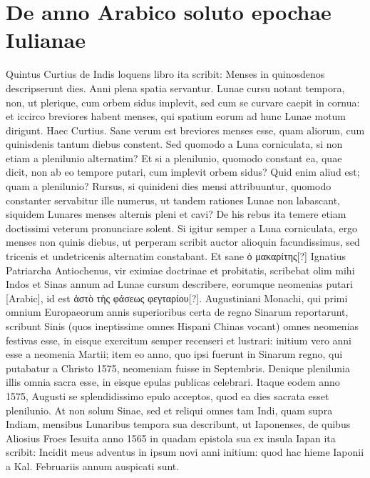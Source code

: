 \section{De anno Arabico soluto epochae Iulianae}
Quintus Curtius de Indis loquens libro  ita scribit: Menses
in quinosdenos descripserunt dies.
Anni plena spatia servantur.
Lunae cursu notant tempora, non, ut plerique, cum orbem
sidus implevit, sed cum se curvare caepit in cornua: et iccirco breviores
habent menses, qui spatium eorum ad hunc Lunae motum dirigunt.
Haec Curtius.
Sane verum est breviores menses esse, quam aliorum,
cum quinisdenis tantum diebus constent.
Sed quomodo a Luna
corniculata, si non etiam a plenilunio alternatim?
Et si a plenilunio,
quomodo constant ea, quae dicit, non ab eo tempore putari, cum implevit
orbem sidus?
Quid enim aliud est; quam a plenilunio?
Rursus,
si quinideni dies mensi attribuuntur, quomodo constanter servabitur
ille numerus, ut tandem rationes Lunae non labascant, siquidem Lunares
menses alternis pleni et cavi?
De his rebus ita temere etiam doctissimi
veterum pronunciare solent.
Si igitur semper a Luna corniculata,
ergo menses non quinis diebus, ut perperam scribit auctor alioquin
facundissimus, sed tricenis et undetricenis alternatim constabant.
Et sane \textgreek{ὁ μακαρίτης[?]} Ignatius Patriarcha Antiochenus,
 vir eximiae
doctrinae et probitatis, scribebat olim mihi Indos et Sinas annum ad
Lunae cursum describere, eorumque neomenias putari \textarabic{[Arabic]},
id est \textgreek{ἀστὸ τὴς φάσεως φεγταρίου[?]}.
Augustiniani Monachi, qui primi
omnium Europaeorum annis superioribus certa de regno Sinarum
reportarunt, scribunt Sinis (quos ineptissime omnes Hispani Chinas
vocant) omnes neomenias festivas esse, in eisque exercitum semper
recenseri et lustrari: initium vero anni esse a neomenia Martii;
item eo anno, quo ipsi fuerunt in Sinarum regno, qui putabatur a
Christo 1575, neomeniam fuisse in  Septembris.
Denique plenilunia
illis omnia sacra esse, in eisque epulas publicas celebrari.
Itaque
eodem anno 1575,  Augusti se splendidissimo epulo acceptos,
quod ea dies sacrata esset plenilunio.
At non solum Sinae, sed et reliqui
omnes tam Indi, quam supra Indiam, mensibus Lunaribus tempora
sua describunt, ut Iaponenses, de quibus Aliosius Froes Iesuita
anno 1565 in quadam epistola sua ex insula Iapan ita scribit: Incidit
meus adventus in ipsum novi anni initium: quod hac hieme Iaponii
a Kal. %
 Februariis annum auspicati sunt.

